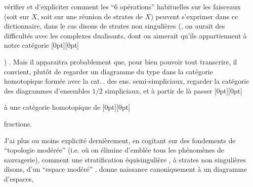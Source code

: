 %
vérifier et d'expliciter comment les ``6 opérations'' habituelles sur les faisceaux (soit sur $X$, soit sur une réunion de strates de $X$) peuvent s'exprimer dans ce dictionnaire, dans le cas disons de strates non singulières (, on aurait des difficultés avec les complexes dualisants, dont on aimerait qu'ils appartiennent à notre catégorie%
\raisebox{0pt}[0pt][0pt]{\parbox{0pt}{}}%
) . Mais il apparaitra probablement que, pour bien pouvoir tout transcrire, il convient, plutôt  de regarder un diagramme du type
dans la catégorie homotopique formée avec la cat.\,. des ens. semi-simpliciaux,  regarder la catégorie des diagrammes d'ensembles $1/2$ simpliciaux, et à partir de là passer%
\raisebox{0pt}[0pt][0pt]{\parbox{0pt}{}} à une catégorie homotopique de %
\raisebox{0pt}[0pt][0pt]{\parbox{0pt}{}}fractions.

J'ai plus ou moins explicité dernièrement, en cogitant sur des fondements de ``topologie modérée'' (i.e. où on élimine d'emblée tous les phénomènes de sauvagerie), comment une stratification équisingulière%
, à strates non singulières disons, d'un ``espace modéré'' , donne naissance canoniquement à un diagramme  d'espaces,
